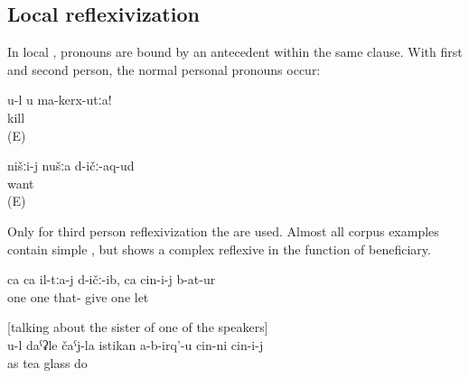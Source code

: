 \subsection{Local reflexivization}
\label{ssec:Local reflexivization}

In local , pronouns are bound by an antecedent within the same clause. With first and second person, the normal personal pronouns occur:
%
\begin{exe}
	\ex	\label{ex:Do not kill yourself}
	\gll	u-l	u	ma-kerx-utːa!\\
				kill\\
	\glt	{} (E)

	\ex	\label{ex:‎We love us}
	\gll	nišːi-j	nušːa	d-ičː-aq-ud\\
				want\\
	\glt	{} (E) 
\end{exe}

Only for third person reflexivization the  are used. Almost all corpus examples contain simple , but  shows a complex reflexive in the function of beneficiary.
%
\begin{exe}
	\ex	\label{ex:(The boy) gave them one pear each, one he kept for himself@1}
	\gll	ca	ca	il-tːa-j	d-ičː-ib,	ca	cin-i-j	b-at-ur\\
		one	one	that-	give	one		let\\
	\glt	{}

	\ex	\label{ex:She does not make herself a glass of tea like you@10} [talking about the sister of one of the speakers]\\
	\gll	u-l	daˁʡle	čaˁj-la	istikan	a-b-irq'-u	cin-ni cin-i-j\\
			as	tea	glass	do		\\
	\glt	 {}
\end{exe}

